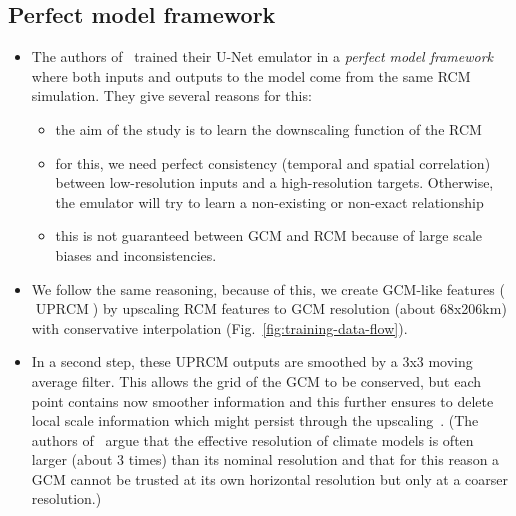 \documentclass[a4paper,11pt,oneside]{report}
\begin{document}
\subsection{Perfect model framework}
\begin{itemize}
    \item The authors of~\cite{Kittel} trained their U-Net emulator in a \textit{perfect model framework} where both inputs and outputs to the model come from the same RCM simulation. They give several reasons for this: 
    \begin{itemize}
        \item the aim of the study is to learn the downscaling function of the RCM
        \item for this, we need perfect consistency (temporal and spatial correlation) between low-resolution inputs and a high-resolution targets. Otherwise, the emulator will try to learn a non-existing or non-exact relationship
        \item this is not guaranteed between GCM and RCM because of large scale biases and inconsistencies. 
    \end{itemize}
    \item We follow the same reasoning, because of this, we create GCM-like features ($\operatorname{UPRCM}$) by upscaling RCM features to GCM resolution (about 68x206km) with conservative interpolation (Fig.~\ref{fig:training-data-flow}). 
    \item In a second step, these UPRCM outputs are smoothed by a 3x3 moving average filter. This allows the grid of the GCM to be conserved, but each point contains now smoother information and this further ensures to delete local scale information which might persist through the upscaling~\cite{Doury, Klaver2020}. (The authors of~\cite{Doury, Klaver2020} argue that the effective resolution of climate models is often larger (about 3 times) than its nominal resolution and that for this reason a GCM cannot be trusted at its own horizontal resolution but only at a coarser resolution.)
\end{itemize}
\end{document}
